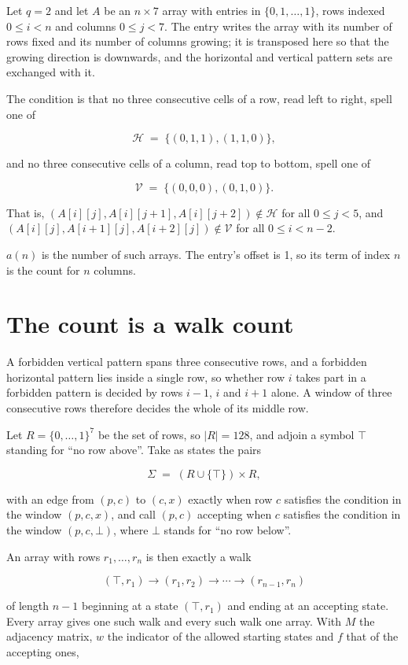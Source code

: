 \documentclass[11pt]{article}
\theoremstyle{definition}
\begin{document}
Let $q = 2$ and let $A$ be an $n \times 7$ array with entries in $\{0,1,\dots,1\}$, rows indexed $0 \le i < n$ and columns $0 \le j < 7$. The entry writes the array with its number of rows fixed and its number of columns growing; it is transposed here so that the growing direction is downwards, and the horizontal and vertical pattern sets are exchanged with it.

The condition is that no three consecutive cells of a row, read left to right, spell one of

\[\mathcal{H} \;=\; \{(0,1,1), (1,1,0)\},\]

and no three consecutive cells of a column, read top to bottom, spell one of

\[\mathcal{V} \;=\; \{(0,0,0), (0,1,0)\}.\]

That is, $(A[i][j],A[i][j{+}1],A[i][j{+}2]) \notin \mathcal{H}$ for all $0 \le j < 5$, and $(A[i][j],A[i{+}1][j],A[i{+}2][j]) \notin \mathcal{V}$ for all $0 \le i < n-2$.

$a(n)$ is the number of such arrays. The entry's offset is 1, so its term of index $n$ is the count for $n$ columns.

\section{The count is a walk count}

A forbidden vertical pattern spans three consecutive rows, and a forbidden horizontal pattern lies inside a single row, so whether row $i$ takes part in a forbidden pattern is decided by rows $i-1$, $i$ and $i+1$ alone. A window of three consecutive rows therefore decides the whole of its middle row.

Let $R = \{0,\dots,1\}^{7}$ be the set of rows, so $|R| = 128$, and adjoin a symbol $\top$ standing for ``no row above''. Take as states the pairs

\[\Sigma \;=\; (R \cup \{\top\}) \times R,\]

with an edge from $(p,c)$ to $(c,x)$ exactly when row $c$ satisfies the condition in the window $(p,c,x)$, and call $(p,c)$ accepting when $c$ satisfies the condition in the window $(p,c,\bot)$, where $\bot$ stands for ``no row below''.

An array with rows $r_1,\dots,r_n$ is then exactly a walk

\[(\top,r_1) \to (r_1,r_2) \to \cdots \to (r_{n-1},r_n)\]

of length $n-1$ beginning at a state $(\top,r_1)$ and ending at an accepting state. Every array gives one such walk and every such walk one array. With $M$ the adjacency matrix, $w$ the indicator of the allowed starting states and $f$ that of the accepting ones,
\end{document}
